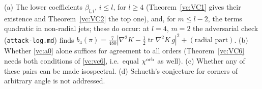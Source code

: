 \begin{remark}
(a) The lower coefficients $\beta_{l,i}$, $i\le l$, for $l\ge4$ (Theorem~\ref{vc:VC1} gives their existence and
Theorem~\ref{vc:VC2} the top one), and, for $m\le l-2$, the terms quadratic in non-radial jets; these do
occur: at $l=4$, $m=2$ the adversarial check (\texttt{attack-log.md}) finds
$b_4(\pi)=\frac7{480}|\nabla^2K-\frac12\operatorname{tr}\nabla^2K\,g|^2+(\text{radial part})$.
(b) Whether \eqref{vc:a0} alone suffices for agreement to all orders (Theorem~\ref{vc:VC6} needs both
conditions of \eqref{vc:vc6}, i.e.\ equal $\chi^{\rm orb}$ as well). (c) Whether any of these pairs can be
made isospectral. (d) Schueth's conjecture for corners of arbitrary angle \cite[Conj.~5.5]{schueth2019} is
not addressed.
\end{remark}
